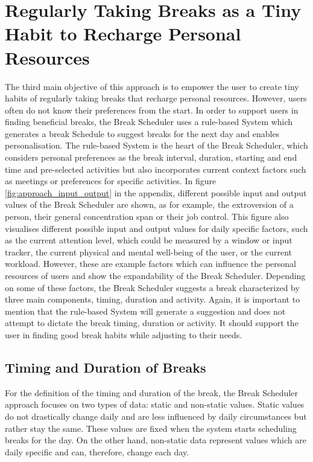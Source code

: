 \documentclass{hasel_thesis}
\begin{document}
\section{Regularly Taking Breaks as a Tiny Habit to Recharge Personal Resources}
The third main objective of this approach is to empower the user to create tiny habits of regularly taking breaks that recharge personal resources. However, users often do not know their preferences from the start. In order to support users in finding beneficial breaks, the Break Scheduler uses a rule-based System which generates a break Schedule to suggest breaks for the next day and enables personalisation. The rule-based System is the heart of the Break Scheduler, which considers personal preferences as the break interval, duration, starting and end time and pre-selected activities but also incorporates current context factors such as meetings or preferences for specific activities. In figure \ref{fig:approach_input_output} in the appendix, different possible input and output values of the Break Scheduler are shown, as for example, the extroversion of a person, their general concentration span or their job control. This figure also visualises different possible input and output values for daily specific factors, such as the current attention level, which could be measured by a window or input tracker, the current physical and mental well-being of the user, or the current workload. However, these are example factors which can influence the personal resources of users and show the expandability of the Break Scheduler. Depending on some of these factors, the Break Scheduler suggests a break characterized by three main components, timing, duration and activity. Again, it is important to mention that the rule-based System will generate a suggestion and does not attempt to dictate the break timing, duration or activity. It should support the user in finding good break habits while adjusting to their needs.


\subsection{Timing and Duration of Breaks}
For the definition of the timing and duration of the break, the Break Scheduler approach focuses on two types of data: static and non-static values. Static values do not drastically change daily and are less influenced by daily circumstances but rather stay the same. These values are fixed when the system starts scheduling breaks for the day. On the other hand, non-static data represent values which are daily specific and can, therefore, change each day. 
\end{document}
